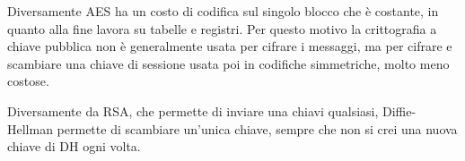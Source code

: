 Diversamente AES ha un costo di codifica sul singolo blocco che è costante, in quanto alla fine lavora su tabelle e registri. Per questo motivo la crittografia a chiave pubblica non è generalmente usata per cifrare i messaggi, ma per cifrare e scambiare una chiave di sessione usata poi in codifiche simmetriche, molto meno costose.  

Diversamente da RSA, che permette di inviare una chiavi qualsiasi, Diffie-Hellman permette di scambiare un'unica chiave, sempre che non si crei una nuova chiave di DH ogni volta. 
